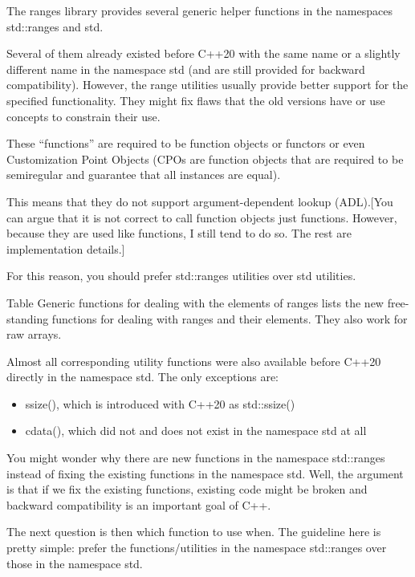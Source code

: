 
The ranges library provides several generic helper functions in the namespaces std::ranges and std.

Several of them already existed before C++20 with the same name or a slightly different name in the namespace std (and are still provided for backward compatibility). However, the range utilities usually provide better support for the specified functionality. They might fix flaws that the old versions have or use concepts to constrain their use.

These “functions” are required to be function objects or functors or even Customization Point Objects (CPOs are function objects that are required to be semiregular and guarantee that all instances are equal).

This means that they do not support argument-dependent lookup (ADL).[You can argue that it is not correct to call function objects just functions. However, because they are used like functions, I still tend to do so. The rest are implementation details.]

For this reason, you should prefer std::ranges utilities over std utilities.


Table Generic functions for dealing with the elements of ranges lists the new free-standing functions for dealing with ranges and their elements. They also work for raw arrays.

Almost all corresponding utility functions were also available before C++20 directly in the namespace std. The only exceptions are:

\begin{itemize}
\item
ssize(), which is introduced with C++20 as std::ssize()

\item
cdata(), which did not and does not exist in the namespace std at all
\end{itemize}

You might wonder why there are new functions in the namespace std::ranges instead of fixing the existing functions in the namespace std. Well, the argument is that if we fix the existing functions, existing code might be broken and backward compatibility is an important goal of C++.

The next question is then which function to use when. The guideline here is pretty simple: prefer the functions/utilities in the namespace std::ranges over those in the namespace std.

